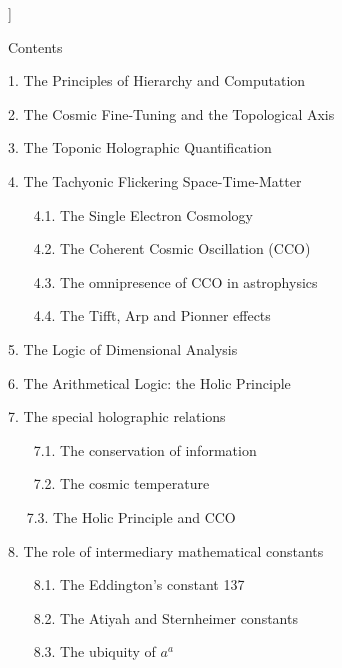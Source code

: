 \documentclass[twoside,draft]{article}
\begin{document}
\begin{sloppypar}
\begin{center}
{{%

}}\smallskip
\end{center}]{%


\setcounter{section}{0}
\setcounter{equation}{0}
\setcounter{figure}{0}
\setcounter{table}{0}
\setcounter{page}{1}


Contents

1. The Principles of Hierarchy and Computation

2. The Cosmic Fine-Tuning and the Topological Axis

3. The Toponic Holographic Quantification

4. The Tachyonic Flickering Space-Time-Matter}

~~~   4.1. The Single Electron Cosmology
   
~~~    4.2. The Coherent Cosmic Oscillation (CCO)
   
~~~    4.3. The omnipresence of CCO in astrophysics
   
~~~    4.4. The Tifft, Arp and Pionner effects
   
5. The Logic of Dimensional Analysis

6. The Arithmetical Logic: the Holic Principle

7. The special holographic relations

~~~    7.1. The conservation of information
   
~~~    7.2. The cosmic temperature

~~     7.3. The Holic Principle and CCO 
    
8. The role of intermediary mathematical constants

~~~    8.1. The Eddington's constant 137
   
~~~    8.2. The Atiyah and Sternheimer constants
   
~~~    8.3. The ubiquity of $a^a$
   

\end{sloppypar}
\end{document}
